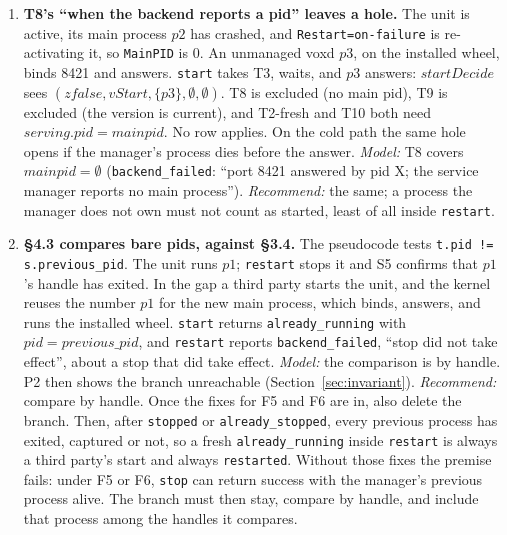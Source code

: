 \documentclass[a4paper,10pt,fleqn]{article}
\begin{document}
\begin{enumerate}
  \item[\textbf{F3.}] \textbf{T8's ``when the backend reports a pid''
    leaves a hole.} The unit is active, its main process $p2$ has crashed,
    and \texttt{Restart=on-failure} is re-activating it, so \texttt{MainPID}
    is 0. An unmanaged voxd $p3$, on the installed wheel, binds 8421 and
    answers. \texttt{start} takes T3, waits, and $p3$ answers:
    $startDecide$ sees $(zfalse, vStart, \{p3\}, \emptyset, \emptyset)$.
    T8 is excluded (no main pid), T9 is excluded (the version is current),
    and T2-fresh and T10 both need $serving.pid = mainpid$. No row applies.
    On the cold path the same hole opens if the manager's process dies
    before the answer. \emph{Model:} T8 covers $mainpid = \emptyset$
    (\texttt{backend\_failed}: ``port 8421 answered by pid X; the service
    manager reports no main process''). \emph{Recommend:} the same; a
    process the manager does not own must not count as started, least of
    all inside \texttt{restart}.

  \item[\textbf{F4.}] \textbf{\S4.3 compares bare pids, against \S3.4.}
    The pseudocode tests \texttt{t.pid != s.previous\_pid}. The unit runs
    $p1$; \texttt{restart} stops it and S5 confirms that $p1$'s handle has
    exited. In the gap a third party starts the unit, and the kernel reuses
    the number $p1$ for the new main process, which binds, answers, and runs
    the installed wheel. \texttt{start} returns \texttt{already\_running}
    with $pid = previous\_pid$, and \texttt{restart} reports
    \texttt{backend\_failed}, ``stop did not take effect'', about a stop
    that did take effect. \emph{Model:} the comparison is by handle. P2 then
    shows the branch unreachable (Section~\ref{sec:invariant}).
    \emph{Recommend:} compare by handle. Once the fixes for F5 and F6 are
    in, also delete the branch. Then, after \texttt{stopped} or
    \texttt{already\_stopped}, every previous process has exited, captured
    or not, so a fresh \texttt{already\_running} inside \texttt{restart} is
    always a third party's start and always \texttt{restarted}. Without
    those fixes the premise fails: under F5 or F6, \texttt{stop} can return
    success with the manager's previous process alive. The branch must then
    stay, compare by handle, and include that process among the handles it
    compares.


\end{enumerate}
\end{document}

